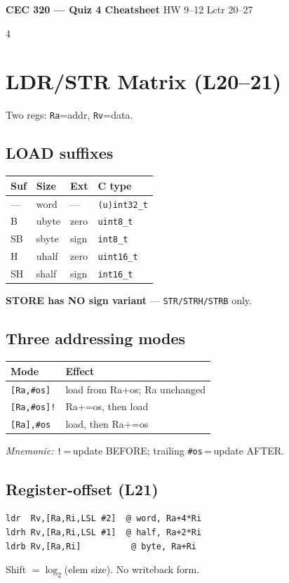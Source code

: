 \documentclass[8pt,landscape]{extarticle}
\newcommand{\asm}[1]{\texttt{\scriptsize #1}}
\newcommand{\cee}[1]{\texttt{\scriptsize #1}}
\begin{document}
\begin{center}
  \textbf{\footnotesize CEC 320 --- Quiz 4 Cheatsheet} \;
  \scriptsize HW 9--12 \textbullet{} Lctr 20--27
\end{center}
\vspace{-8pt}

\begin{multicols*}{4}
\scriptsize

\section{LDR/STR Matrix (L20--21)}
Two regs: \texttt{Ra}=addr, \texttt{Rv}=data.

\subsection{LOAD suffixes}
\begin{tabular}{@{}llll@{}}
\toprule
Suf & Size & Ext & C type \\
\midrule
--- & word  & --- & \cee{(u)int32\_t} \\
B   & ubyte & zero & \cee{uint8\_t} \\
SB  & sbyte & sign & \cee{int8\_t} \\
H   & uhalf & zero & \cee{uint16\_t} \\
SH  & shalf & sign & \cee{int16\_t} \\
\bottomrule
\end{tabular}

\textbf{STORE has NO sign variant} --- \texttt{STR/STRH/STRB} only.

\subsection{Three addressing modes}
\begin{tabular}{@{}ll@{}}
\toprule
Mode & Effect \\
\midrule
\asm{[Ra,\#os]}   & load from Ra+os; Ra unchanged \\
\asm{[Ra,\#os]!}  & Ra+=os, then load \\
\asm{[Ra],\#os}   & load, then Ra+=os \\
\bottomrule
\end{tabular}

\textit{Mnemonic:} \texttt{!}\,=\,update BEFORE; trailing \texttt{\#os}\,=\,update AFTER.

\subsection{Register-offset (L21)}
\begin{lstlisting}
ldr  Rv,[Ra,Ri,LSL #2]  @ word, Ra+4*Ri
ldrh Rv,[Ra,Ri,LSL #1]  @ half, Ra+2*Ri
ldrb Rv,[Ra,Ri]          @ byte, Ra+Ri
\end{lstlisting}
Shift $=\log_2$(elem size). No writeback form.


\end{multicols*}
\end{document}
